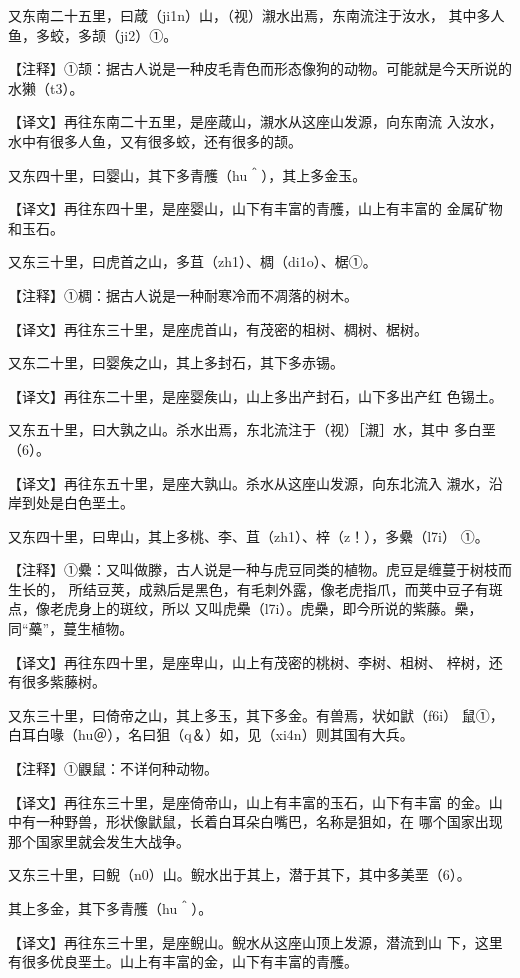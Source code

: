 \documentclass[a4paper,12pt,UTF8,twoside]{ctexbook}
\begin{document}
又东南二十五里，曰葴（ji1n）山，（视）瀙水出焉，东南流注于汝水， 其中多人鱼，多蛟，多颉（ji2）①。

【注释】①颉：据古人说是一种皮毛青色而形态像狗的动物。可能就是今天所说的水獭（t3）。

【译文】再往东南二十五里，是座葴山，瀙水从这座山发源，向东南流 入汝水，水中有很多人鱼，又有很多蛟，还有很多的颉。

又东四十里，曰婴山，其下多青雘（hu＾），其上多金玉。

【译文】再往东四十里，是座婴山，山下有丰富的青雘，山上有丰富的 金属矿物和玉石。

又东三十里，曰虎首之山，多苴（zh1）、椆（di1o）、椐①。

【注释】①椆：据古人说是一种耐寒冷而不凋落的树木。

【译文】再往东三十里，是座虎首山，有茂密的柤树、椆树、椐树。

又东二十里，曰婴矦之山，其上多封石，其下多赤锡。

【译文】再往东二十里，是座婴矦山，山上多出产封石，山下多出产红 色锡土。

又东五十里，曰大孰之山。杀水出焉，东北流注于（视）［瀙］水，其中 多白垩（6）。

【译文】再往东五十里，是座大孰山。杀水从这座山发源，向东北流入 瀙水，沿岸到处是白色垩土。

又东四十里，曰卑山，其上多桃、李、苴（zh1）、梓（z！），多纍（l7i） ①。

【注释】①纍：又叫做滕，古人说是一种与虎豆同类的植物。虎豆是缠蔓于树枝而生长的， 所结豆荚，成熟后是黑色，有毛刺外露，像老虎指爪，而荚中豆子有斑点，像老虎身上的斑纹，所以 又叫虎櫐（l7i）。虎櫐，即今所说的紫藤。櫐，同“蘽”，蔓生植物。

【译文】再往东四十里，是座卑山，山上有茂密的桃树、李树、柤树、 梓树，还有很多紫藤树。

又东三十里，曰倚帝之山，其上多玉，其下多金。有兽焉，状如鼣（f6i） 鼠①，白耳白喙（hu＠），名曰狙（q＆）如，见（xi4n）则其国有大兵。

【注释】①鼳鼠：不详何种动物。

【译文】再往东三十里，是座倚帝山，山上有丰富的玉石，山下有丰富 的金。山中有一种野兽，形状像鼣鼠，长着白耳朵白嘴巴，名称是狙如，在 哪个国家出现那个国家里就会发生大战争。

又东三十里，曰鲵（n0）山。鲵水出于其上，潜于其下，其中多美垩（6）。

其上多金，其下多青雘（hu＾）。

【译文】再往东三十里，是座鲵山。鲵水从这座山顶上发源，潜流到山 下，这里有很多优良垩土。山上有丰富的金，山下有丰富的青雘。
\end{document}
